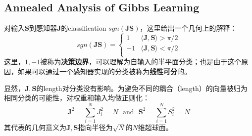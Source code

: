 \documentclass[11pt,fleqn, UTF8]{ctexbook} %
\begin{document}
\begin{subappendices}
\subsection{Annealed Analysis of Gibbs Learning}
对输入$\boldsymbol{S}$到感知器$\boldsymbol{J}$的classification $sgn(\boldsymbol{JS})$，这里给出一个几何上的解释：
\begin{equation*}
  sgn(\boldsymbol{JS}) =
  \begin{cases}
    1       & \langle\boldsymbol{J},\boldsymbol{S}\rangle>\pi/2\\
    -1  & \langle\boldsymbol{J},\boldsymbol{S}\rangle<\pi/2\\
  \end{cases}
\end{equation*}
这里，$1,-1$被称为\textbf{决策边界}，可以理解为自输入的半平面分类；也是由于这个原因，如果可以通过一个感知器实现的分类被称为\textbf{线性可分}的。

显然，$\boldsymbol{J},\boldsymbol{S}$的length对分类没有影响。为避免不同的耦合（length）的向量被归为相同分类的可能性，对权重和输入均做正则化：
\begin{equation*}
  \boldsymbol{J}^2=\sum_{i=1}^NJ_i^2=N~~~\text{and}~~~\boldsymbol{S}^2=\sum_{i=1}^NS_i^2=N
\end{equation*}
其代表的几何意义为$\boldsymbol{J},\boldsymbol{S}$指向半径为$\sqrt{N}$的$N$维超球面。


\end{subappendices}
\end{document}

